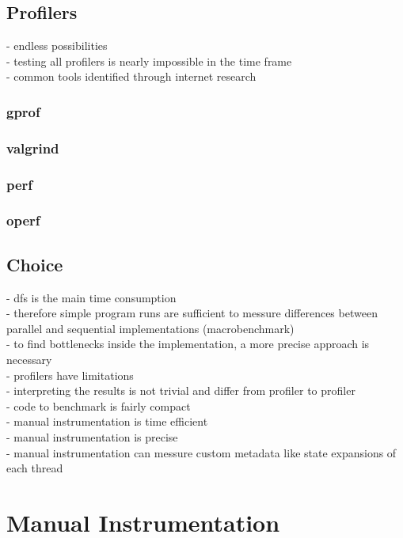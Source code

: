 \subsection{Profilers}
- endless possibilities \\
- testing all profilers is nearly impossible in the time frame\\
- common tools identified through internet research\\
\subsubsection{gprof}
\subsubsection{valgrind}
\subsubsection{perf}
\subsubsection{operf}
\subsection{Choice}
- dfs is the main time consumption\\
- therefore simple program runs are sufficient to messure differences between parallel and sequential implementations (macrobenchmark)\\
- to find bottlenecks inside the implementation, a more precise approach is necessary\\
- profilers have limitations\\
- interpreting the results is not trivial and differ from profiler to profiler\\
- code to benchmark is fairly compact\\
- manual instrumentation is time efficient\\
- manual instrumentation is precise\\
- manual instrumentation can messure custom metadata like state expansions of each thread\\

\section{Manual Instrumentation}
